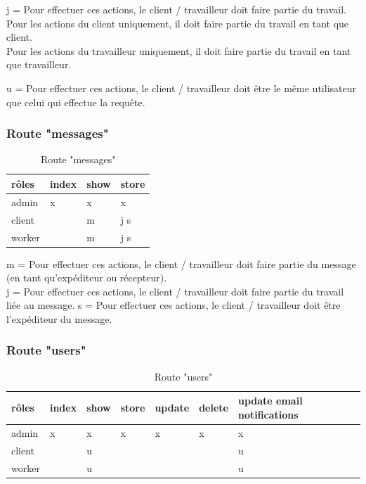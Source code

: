 \documentclass[
    iai, %
    il, %
]{heig-tb}
\begin{document}
j = Pour effectuer ces actions, le client / travailleur doit faire partie du travail. \\
Pour les actions du client uniquement, il doit faire partie du travail en tant que client. \\
Pour les actions du travailleur uniquement, il doit faire partie du travail en tant que travailleur.

u = Pour effectuer ces actions, le client / travailleur doit être le même utilisateur que celui qui effectue la requête.

\subsubsection{Route "messages"}

\begin{table}[h]
    \begin{center}
        \caption{Route "messages" \label{autorisations-route-messages}}
        \begin{tabularx}{1.0\textwidth} {X|X}
            rôles  & index & show & store \\ \hline
            admin  & x     & x    & x     \\
            client &       & m    & j s   \\
            worker &       & m    & j s   \\
        \end{tabularx}
    \end{center}
\end{table}

m = Pour effectuer ces actions, le client / travailleur doit faire partie du message (en tant qu'expéditeur ou récepteur). \\
j = Pour effectuer ces actions, le client / travailleur doit faire partie du travail liée au message.
s = Pour effectuer ces actions, le client / travailleur doit être l'expéditeur du message.

\subsubsection{Route "users"}

\begin{table}[h]
    \begin{center}
        \caption{Route "users" \label{autorisations-route-users}}
        \begin{tabularx}{1.0\textwidth} {X|X}
            rôles  & index & show & store & update & delete & update email notifications \\ \hline
            admin  & x     & x    & x     & x      & x      & x                          \\
            client &       & u    &       &        &        & u                          \\
            worker &       & u    &       &        &        & u                          \\
        \end{tabularx}
    \end{center}
\end{table}
\end{document}
